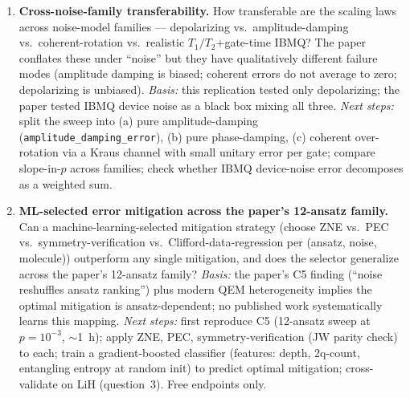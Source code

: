 \begin{enumerate}
\item \textbf{Cross-noise-family transferability.}
How transferable are the scaling laws across noise-model families ---
depolarizing vs.\ amplitude-damping vs.\ coherent-rotation vs.\ realistic
$T_1/T_2$+gate-time IBMQ? The paper conflates these under ``noise'' but
they have qualitatively different failure modes (amplitude damping is
biased; coherent errors do not average to zero; depolarizing is unbiased).
\emph{Basis:} this replication tested only depolarizing; the paper tested
IBMQ device noise as a black box mixing all three.
\emph{Next steps:} split the sweep into (a) pure amplitude-damping
(\texttt{amplitude\_damping\_error}), (b) pure phase-damping, (c) coherent
over-rotation via a Kraus channel with small unitary error per gate;
compare slope-in-$p$ across families; check whether IBMQ device-noise
error decomposes as a weighted sum.

\item \textbf{ML-selected error mitigation across the paper's 12-ansatz family.}
Can a machine-learning-selected mitigation strategy (choose ZNE vs.\ PEC vs.\
symmetry-verification vs.\ Clifford-data-regression per (ansatz, noise,
molecule)) outperform any single mitigation, and does the selector
generalize across the paper's 12-ansatz family?
\emph{Basis:} the paper's C5 finding (``noise reshuffles ansatz ranking'')
plus modern QEM heterogeneity implies the optimal mitigation is
ansatz-dependent; no published work systematically learns this mapping.
\emph{Next steps:} first reproduce C5 (12-ansatz sweep at $p{=}10^{-3}$,
$\sim$1~h); apply ZNE, PEC, symmetry-verification (JW parity check) to
each; train a gradient-boosted classifier (features: depth, 2q-count,
entangling entropy at random init) to predict optimal mitigation;
cross-validate on LiH (question~3). Free endpoints only.

\end{enumerate}
